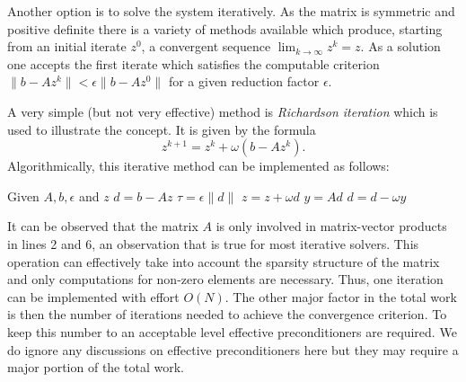 \documentclass[a4paper,
		     11pt,
		     DIV12,
		     DIVcalc,
		     headings=normal,
		     oneside,
		     bibliography=totoc,
		     headsepline=false,
		     headinclude]{scrartcl}
\begin{document}
Another option is to solve the system iteratively. As the matrix is symmetric and positive
definite there is a variety of methods available which produce, starting from an
initial iterate $z^0$, a convergent sequence $\lim_{k\to\infty} z^k = z$. As a solution
one accepts the first iterate which satisfies the computable criterion
$\|b-Az^k\| < \epsilon \|b-Az^0\|$ for a given reduction factor $\epsilon$.

A very simple (but not very effective) method is {\em Richardson iteration} which is
used to illustrate the concept. It is given by the formula
$$ z^{k+1} = z^{k} + \omega (b-Az^{k}).$$
Algorithmically, this iterative method can be implemented as follows:
\begin{algorithmic}[1]
\State Given $A, b, \epsilon$ and $z$ 
\State $d = b-Az$ 
\State $\tau = \epsilon \|d\|$ 
 
\State $z = z + \omega d$ 
\State $y = A d$ 
\State $d = d - \omega y$ 
\EndWhile
\end{algorithmic}
It can be observed that the matrix $A$ is only involved in matrix-vector
products in lines 2 and 6, an observation that is true for most iterative
solvers. This operation can effectively take into account the sparsity structure
of the matrix and only computations for non-zero elements are necessary.
Thus, one iteration can be implemented with effort $O(N)$. 
The other major factor in the total work is then the number
of iterations needed to achieve the convergence criterion. To keep this
number to an acceptable level effective preconditioners are required.
We do ignore any discussions on effective preconditioners here but they may require 
a major portion of the total work.
\end{document}
